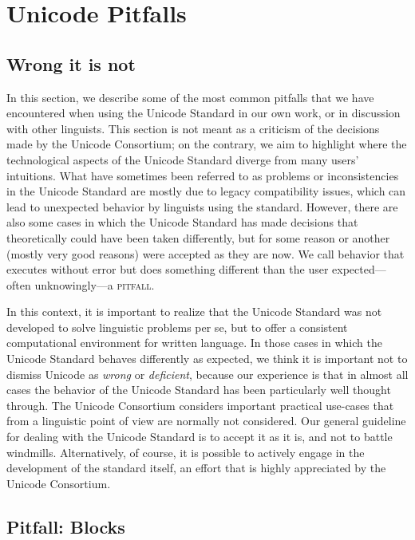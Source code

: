 \chapter{Unicode Pitfalls}
\label{unicode-pitfalls}

\section{Wrong it is not}
\label{wrong-it-is-not}

In this section, we describe some of the most common pitfalls that we have encountered when using the Unicode Standard in our own work, or in discussion with other linguists. This section is not meant as a criticism of the decisions made by the Unicode Consortium; on the contrary, we aim to highlight where the technological aspects of the Unicode Standard diverge from many users' intuitions. What have sometimes been referred to as problems or inconsistencies in the Unicode Standard are mostly due to legacy compatibility issues, which can lead to unexpected behavior by linguists using the standard. However, there are also some cases in which the Unicode Standard has made decisions that theoretically could have been taken differently, but for some reason or another (mostly very good reasons) were accepted as they are now. We call behavior that executes without error but does something different than the user expected---often unknowingly---a \textsc{pitfall}.

In this context, it is important to realize that the Unicode Standard was not developed to solve linguistic problems per se, but to offer a consistent computational environment for written language. In those cases in which the Unicode Standard behaves differently as expected, we think it is important not to dismiss Unicode as \textit{wrong} or \textit{deficient}, because our experience is that in almost all cases the behavior of the Unicode Standard has been particularly well thought through. The Unicode Consortium considers important practical use-cases that from a linguistic point of view are normally not considered. Our general guideline for dealing with the Unicode Standard is to accept it as it is, and not to battle windmills. Alternatively, of course, it is possible to actively engage in the development of the standard itself, an effort that is highly appreciated by the Unicode Consortium.

\section{Pitfall: Blocks}
\label{pitfall-blocks}

